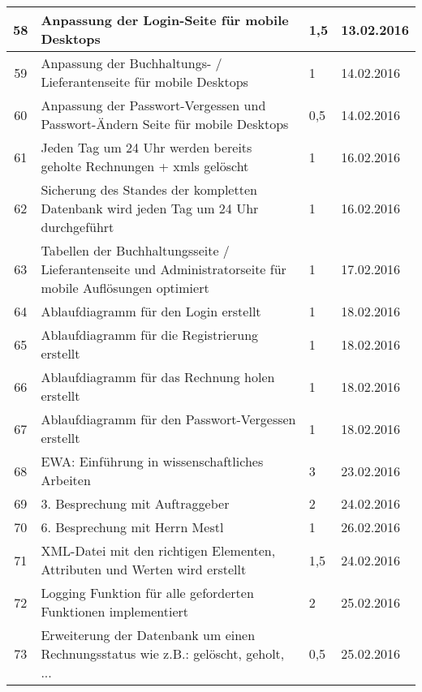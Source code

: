 \begin{longtable}[h]{| c | p{11.6cm} | l | l |}
58 & Anpassung der Login-Seite für mobile Desktops & 1,5 & 13.02.2016 \\ \hline

59 & Anpassung der Buchhaltungs- / Lieferantenseite für mobile Desktops & 1 & 14.02.2016 \\ \hline

60 & Anpassung der Passwort-Vergessen und Passwort-Ändern Seite für mobile Desktops & 0,5 & 14.02.2016 \\ \hline

61 & Jeden Tag um 24 Uhr werden bereits geholte Rechnungen + xmls gelöscht & 1 & 16.02.2016 \\ \hline

62 & Sicherung des Standes der kompletten Datenbank wird jeden Tag um 24 Uhr durchgeführt & 1 & 16.02.2016 \\ \hline

63 & Tabellen der Buchhaltungsseite / Lieferantenseite und Administratorseite für mobile Auflösungen optimiert & 1 & 17.02.2016 \\ \hline

64 & Ablaufdiagramm für den Login erstellt & 1 & 18.02.2016 \\ \hline

65 & Ablaufdiagramm für die Registrierung erstellt & 1 & 18.02.2016 \\ \hline

66 & Ablaufdiagramm für das Rechnung holen erstellt & 1 & 18.02.2016 \\ \hline

67 & Ablaufdiagramm für den Passwort-Vergessen erstellt & 1 & 18.02.2016 \\ \hline

68 & EWA: Einführung in wissenschaftliches Arbeiten & 3 & 23.02.2016 \\ \hline

69 & 3. Besprechung mit Auftraggeber & 2 & 24.02.2016 \\ \hline

70 & 6. Besprechung mit Herrn Mestl & 1 & 26.02.2016 \\ \hline

71 & XML-Datei mit den richtigen Elementen, Attributen und Werten wird erstellt & 1,5 & 24.02.2016 \\ \hline

72 & Logging Funktion für alle geforderten Funktionen implementiert & 2 & 25.02.2016 \\ \hline

73 & Erweiterung der Datenbank um einen Rechnungsstatus wie z.B.: gelöscht, geholt, ... & 0,5 & 25.02.2016 \\ \hline


\end{longtable}
